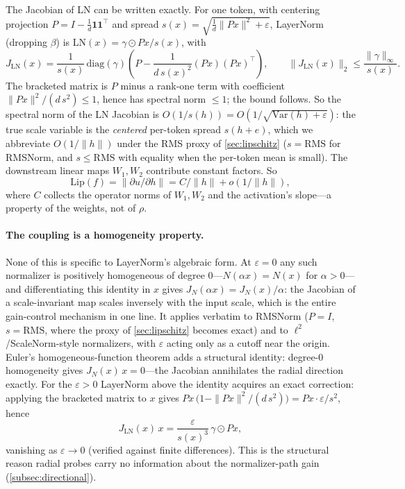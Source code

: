 \documentclass[11pt]{article}
\begin{document}
The Jacobian of LN can be written exactly. For one token, with centering projection $P = I - \tfrac{1}{d}\mathbf{1}\mathbf{1}^\top$ and spread $s(x) = \sqrt{\tfrac{1}{d}\|Px\|^2 + \varepsilon}$, LayerNorm (dropping $\beta$) is $\text{LN}(x) = \gamma \odot Px/s(x)$, with
\begin{equation}
J_{\text{LN}}(x) = \frac{1}{s(x)}\,\text{diag}(\gamma)\left(P - \frac{1}{d\,s(x)^2}(Px)(Px)^\top\right),
\qquad
\|J_{\text{LN}}(x)\|_2 \le \frac{\|\gamma\|_\infty}{s(x)}.
\end{equation}
The bracketed matrix is $P$ minus a rank-one term with coefficient $\|Px\|^2/(d\,s^2) \le 1$, hence has spectral norm $\le 1$; the bound follows. So the spectral norm of the LN Jacobian is $O(1/s(h)) = O(1/\sqrt{\text{Var}(h)+\varepsilon})$: the true scale variable is the \emph{centered} per-token spread $s(h+e)$, which we abbreviate $O(1/\|h\|)$ under the RMS proxy of \cref{sec:lipschitz} ($s = \text{RMS}$ for RMSNorm, and $s \le \text{RMS}$ with equality when the per-token mean is small). The downstream linear maps $W_1, W_2$ contribute constant factors. So
\begin{equation}
\text{Lip}(f) = \|\partial u / \partial h\| = C/\|h\| + o(1/\|h\|),
\end{equation}
where $C$ collects the operator norms of $W_1, W_2$ and the activation's slope---a property of the weights, not of $\rho$.

\paragraph{The coupling is a homogeneity property.} None of this is specific to LayerNorm's algebraic form. At $\varepsilon = 0$ any such normalizer is positively homogeneous of degree $0$---$N(\alpha x) = N(x)$ for $\alpha > 0$---and differentiating this identity in $x$ gives $J_N(\alpha x) = J_N(x)/\alpha$: the Jacobian of a scale-invariant map scales inversely with the input scale, which is the entire gain-control mechanism in one line. It applies verbatim to RMSNorm ($P = I$, $s = \text{RMS}$, where the proxy of \cref{sec:lipschitz} becomes exact) and to $\ell^2$/ScaleNorm-style normalizers, with $\varepsilon$ acting only as a cutoff near the origin. Euler's homogeneous-function theorem adds a structural identity: degree-$0$ homogeneity gives $J_N(x)\,x = 0$---the Jacobian annihilates the radial direction exactly. For the $\varepsilon > 0$ LayerNorm above the identity acquires an exact correction: applying the bracketed matrix to $x$ gives $Px\,\big(1 - \|Px\|^2/(d\,s^2)\big) = Px \cdot \varepsilon/s^2$, hence
\begin{equation}
J_{\text{LN}}(x)\,x = \frac{\varepsilon}{s(x)^3}\,\gamma \odot Px,
\end{equation}
vanishing as $\varepsilon \to 0$ (verified against finite differences). This is the structural reason radial probes carry no information about the normalizer-path gain (\cref{subsec:directional}).
\end{document}
